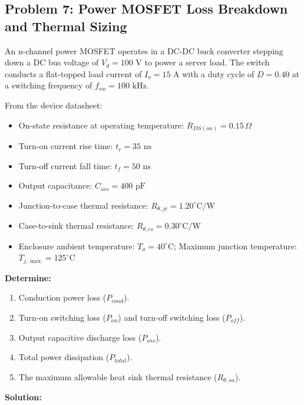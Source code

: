 \documentclass[11pt,a4paper]{article}
\begin{document}
\subsection{Problem 7: Power MOSFET Loss Breakdown and Thermal Sizing}

\begin{examplebox}
An n-channel power MOSFET operates in a DC-DC buck converter stepping down a DC bus voltage of $V_d = 100\text{ V}$ to power a server load. The switch conducts a flat-topped load current of $I_o = 15\text{ A}$ with a duty cycle of $D = 0.40$ at a switching frequency of $f_{sw} = 100\text{ kHz}$.

From the device datasheet:
\begin{itemize}[leftmargin=*]
  \item On-state resistance at operating temperature: $R_{DS(on)} = 0.15\,\Omega$
  \item Turn-on current rise time: $t_r = 35\text{ ns}$
  \item Turn-off current fall time: $t_f = 50\text{ ns}$
  \item Output capacitance: $C_{oss} = 400\text{ pF}$
  \item Junction-to-case thermal resistance: $R_{\theta,jc} = 1.20^\circ\text{C/W}$
  \item Case-to-sink thermal resistance: $R_{\theta,cs} = 0.30^\circ\text{C/W}$
  \item Enclosure ambient temperature: $T_a = 40^\circ\text{C}$; Maximum junction temperature: $T_{j,\max} = 125^\circ\text{C}$
\end{itemize}

\textbf{Determine:}
\begin{enumerate}[label=(\alph*)]
  \item Conduction power loss ($P_{cond}$).
  \item Turn-on switching loss ($P_{on}$) and turn-off switching loss ($P_{off}$).
  \item Output capacitive discharge loss ($P_{oss}$).
  \item Total power dissipation ($P_{total}$).
  \item The maximum allowable heat sink thermal resistance ($R_{\theta,sa}$).
\end{enumerate}

\tcblower
\textbf{Solution:}


\end{examplebox}
\end{document}
